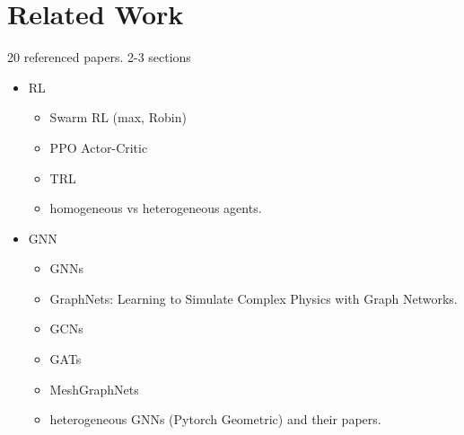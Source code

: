 
\chapter{Related Work}
\label{ch:Related Work}

20 referenced papers. 2-3 sections
\begin{itemize}[noitemsep,nolistsep]
	\item RL
	\begin{itemize}[noitemsep,nolistsep]
        \item Swarm RL (max, Robin)
        \item PPO Actor-Critic
        \item TRL
        \item homogeneous vs heterogeneous agents.
    \end{itemize}
    
	\item GNN
	\begin{itemize}[noitemsep,nolistsep]
        \item GNNs
        \item GraphNets: Learning to Simulate Complex Physics with Graph Networks.
        \item GCNs
        \item GATs
        \item MeshGraphNets
        \item heterogeneous GNNs (Pytorch Geometric) and their papers.
    \end{itemize}
\end{itemize}
